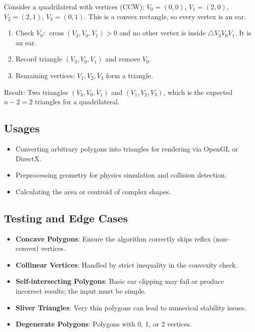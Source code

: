 \begin{example}\label{ex:ear_clipping_trace}
Consider a quadrilateral with vertices (CCW): $V_0=(0,0)$, $V_1=(2,0)$, $V_2=(2,1)$, $V_3=(0,1)$. This is a convex rectangle, so every vertex is an ear.
\begin{enumerate}
\item Check $V_0$: $\operatorname{cross}(V_3, V_0, V_1) > 0$ and no other vertex is inside $\triangle V_3 V_0 V_1$. It is an ear.
\item Record triangle $(V_3, V_0, V_1)$ and remove $V_0$.
\item Remaining vertices: $V_1, V_2, V_3$ form a triangle.
\end{enumerate}
Result: Two triangles $(V_3, V_0, V_1)$ and $(V_1, V_2, V_3)$, which is the expected $n - 2 = 2$ triangles for a quadrilateral.
\end{example}

\subsection{Usages}

\begin{itemize}
\item Converting arbitrary polygons into triangles for rendering via OpenGL or DirectX.
\item Preprocessing geometry for physics simulation and collision detection.
\item Calculating the area or centroid of complex shapes.
\end{itemize}

\subsection{Testing and Edge Cases}

\begin{itemize}
\item \textbf{Concave Polygons}: Ensure the algorithm correctly skips reflex (non-convex) vertices.
\item \textbf{Collinear Vertices}: Handled by strict inequality in the convexity check.
\item \textbf{Self-intersecting Polygons}: Basic ear clipping may fail or produce incorrect results; the input must be simple.
\item \textbf{Sliver Triangles}: Very thin polygons can lead to numerical stability issues.
\item \textbf{Degenerate Polygons}: Polygons with 0, 1, or 2 vertices.
\end{itemize}

